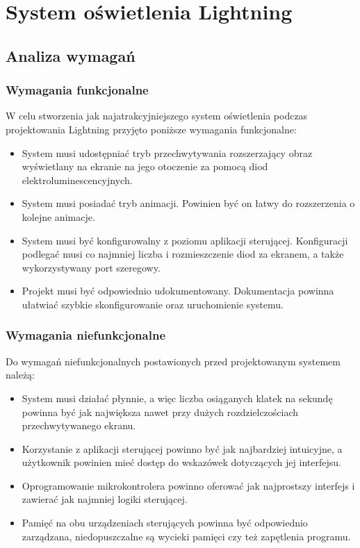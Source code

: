 \documentclass[12pt]{report}
\begin{document}
\chapter{System oświetlenia Lightning}

\section{Analiza wymagań}

\subsection{Wymagania funkcjonalne}

W celu stworzenia jak najatrakcyjniejszego system oświetlenia podczas projektowania Lightning przyjęto poniższe wymagania funkcjonalne:

\begin{itemize}
\item System musi udostępniać tryb przechwytywania rozszerzający obraz wyświetlany na ekranie na jego otoczenie za pomocą diod elektroluminescencyjnych.
\item System musi posiadać tryb animacji. Powinien być on łatwy do rozszerzenia o kolejne animacje.
\item System musi być konfigurowalny z poziomu aplikacji sterującej. Konfiguracji podlegać musi co najmniej liczba i rozmieszczenie diod za ekranem, a także wykorzystywany port szeregowy.
\item Projekt musi być odpowiednio udokumentowany. Dokumentacja powinna ułatwiać szybkie skonfigurowanie oraz uruchomienie systemu.
\end{itemize}

\subsection{Wymagania niefunkcjonalne}

Do wymagań niefunkcjonalnych postawionych przed projektowanym systemem należą:

\begin{itemize}
\item System musi działać płynnie, a więc liczba osiąganych klatek na sekundę powinna być jak największa nawet przy dużych rozdzielczościach przechwytywanego ekranu.
\item Korzystanie z aplikacji sterującej powinno być jak najbardziej intuicyjne, a użytkownik powinien mieć dostęp do wskazówek dotyczących jej interfejsu.
\item Oprogramowanie mikrokontrolera powinno oferować jak najprostszy interfejs i zawierać jak najmniej logiki sterującej.
\item Pamięć na obu urządzeniach sterujących powinna być odpowiednio zarządzana, niedopuszczalne są wycieki pamięci czy też zapętlenia programu.
\end{itemize}
\end{document}
